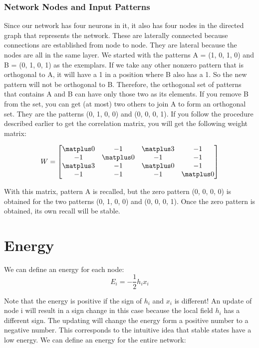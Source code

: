 \subsubsection{Network Nodes and Input Patterns}
Since our network has four neurons in it, it also has four nodes in the directed
graph that represents the network. These are laterally connected because
connections are established from node to node. They are lateral because the
nodes are all in the same layer. We started with the patterns A = (1, 0, 1, 0)
and B = (0, 1, 0, 1) as the exemplars. If we take any other nonzero pattern that
is orthogonal to A, it will have a 1 in a position where B also has a 1. So the
new pattern will not be orthogonal to B. Therefore, the orthogonal set of
patterns that contains A and B can have only those two as its elements. If you
remove B from the set, you can get (at most) two others to join A to form an
orthogonal set. They are the patterns (0, 1, 0, 0) and (0, 0, 0, 1).
If you follow the procedure described earlier to get the correlation matrix, you
will get the following weight matrix:


\[ 
W = \begin{bmatrix}
 \matplus0 & -1         &  \matplus3 & -1 \\
  -1       &  \matplus0 &  -1        &  -1 \\
 \matplus3 & -1         &  \matplus0 & -1 \\
-1         &  -1        & -1         &  \matplus0 \\
\end{bmatrix}
\]

With this matrix, pattern A is recalled, but the zero pattern (0, 0, 0, 0) is
obtained for the two patterns (0, 1, 0, 0) and (0, 0, 0, 1). Once the zero pattern
is obtained, its own recall will be stable.

\section{Energy}
We can define an energy for each node:
\[
E_i = - \frac{1}{2}h_ix_i
\]

Note that the energy is positive if the sign of $h_i$ and $x_i$
is different! An update of node i will result in a sign change in this case because the local field $h_i$ has a different sign. The updating will change the energy form a positive number
to a negative number. This corresponds to the intuitive idea that stable states
have a low energy. We can define an energy for the entire network:

